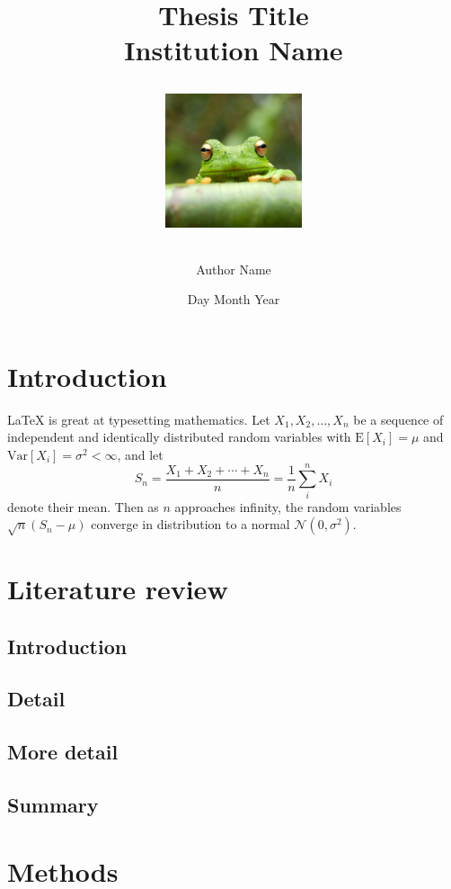 \documentclass[report,11pt]{article}
\title{
{Thesis Title}\\
{\large Institution Name}\\

\hfill

{\includegraphics[width=0.3\textwidth]{frog}}

\author{Author Name}
\date{Day Month Year}
}
\begin{document}
\maketitle

\newpage



\tableofcontents
\newpage




\begin{abstract}

\end{abstract}

 \section{Introduction}

\LaTeX{} is great at typesetting mathematics. Let $X_1, X_2, \ldots, X_n$ be a sequence of independent and identically distributed random variables with $\text{E}[X_i] = \mu$ and $\text{Var}[X_i] = \sigma^2 < \infty$, and let
$$S_n = \frac{X_1 + X_2 + \cdots + X_n}{n}
      = \frac{1}{n}\sum_{i}^{n} X_i$$
denote their mean. Then as $n$ approaches infinity, the random variables $\sqrt{n}(S_n - \mu)$ converge in distribution to a normal $\mathcal{N}(0, \sigma^2)$.
\newpage

\section{Literature review} %
    \subsection{Introduction}
	
	
	\subsection{Detail}

	\subsection{More detail}
	\subsection{Summary}


\section{Methods} %
\end{document}
